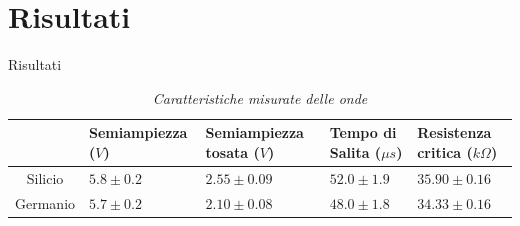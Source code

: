 \section{Risultati}\label{sec:risultati}
  Risultati
\begin{table}[H]
  \centering
  \begin{tabular}[t]{c | p{3cm}  p{3cm}  p{3cm}  p{3cm}}
    \hline
		& Semiampiezza ($V$) & Semiampiezza tosata ($V$) & Tempo di Salita ($\mu s$) & Resistenza critica ($k \Omega$) \\
      \hline
	Silicio & $5.8 \pm 0.2$ & $2.55 \pm 0.09$ & $52.0 \pm 1.9$ & $35.90 \pm 0.16$ \\
	Germanio & $5.7 \pm 0.2$ & $2.10 \pm 0.08$ & $48.0 \pm 1.8$ & $34.33 \pm 0.16$ \\
      \hline
    \end{tabular}
    \caption{\emph{Caratteristiche misurate delle onde}}
    \label{tab : risultati}
  \end{table}
